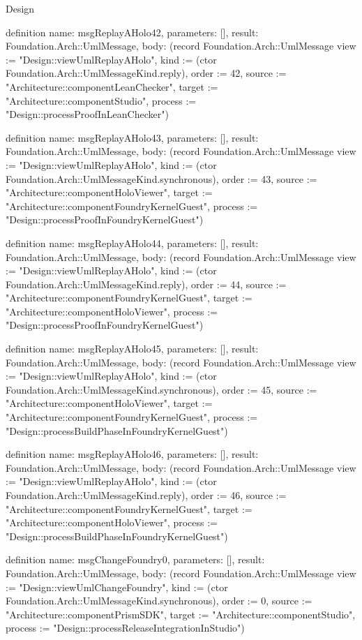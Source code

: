 \begin{lexlean}{Design}
\begin{semanticmodule}
definition{
  name: msgReplayAHolo42,
  parameters: [],
  result: Foundation.Arch::UmlMessage,
  body: (record Foundation.Arch::UmlMessage {view := "Design::viewUmlReplayAHolo", kind := (ctor Foundation.Arch::UmlMessageKind.reply), order := 42, source := "Architecture::componentLeanChecker", target := "Architecture::componentStudio", process := "Design::processProofInLeanChecker"})
}

definition{
  name: msgReplayAHolo43,
  parameters: [],
  result: Foundation.Arch::UmlMessage,
  body: (record Foundation.Arch::UmlMessage {view := "Design::viewUmlReplayAHolo", kind := (ctor Foundation.Arch::UmlMessageKind.synchronous), order := 43, source := "Architecture::componentHoloViewer", target := "Architecture::componentFoundryKernelGuest", process := "Design::processProofInFoundryKernelGuest"})
}

definition{
  name: msgReplayAHolo44,
  parameters: [],
  result: Foundation.Arch::UmlMessage,
  body: (record Foundation.Arch::UmlMessage {view := "Design::viewUmlReplayAHolo", kind := (ctor Foundation.Arch::UmlMessageKind.reply), order := 44, source := "Architecture::componentFoundryKernelGuest", target := "Architecture::componentHoloViewer", process := "Design::processProofInFoundryKernelGuest"})
}

definition{
  name: msgReplayAHolo45,
  parameters: [],
  result: Foundation.Arch::UmlMessage,
  body: (record Foundation.Arch::UmlMessage {view := "Design::viewUmlReplayAHolo", kind := (ctor Foundation.Arch::UmlMessageKind.synchronous), order := 45, source := "Architecture::componentHoloViewer", target := "Architecture::componentFoundryKernelGuest", process := "Design::processBuildPhaseInFoundryKernelGuest"})
}

definition{
  name: msgReplayAHolo46,
  parameters: [],
  result: Foundation.Arch::UmlMessage,
  body: (record Foundation.Arch::UmlMessage {view := "Design::viewUmlReplayAHolo", kind := (ctor Foundation.Arch::UmlMessageKind.reply), order := 46, source := "Architecture::componentFoundryKernelGuest", target := "Architecture::componentHoloViewer", process := "Design::processBuildPhaseInFoundryKernelGuest"})
}

definition{
  name: msgChangeFoundry0,
  parameters: [],
  result: Foundation.Arch::UmlMessage,
  body: (record Foundation.Arch::UmlMessage {view := "Design::viewUmlChangeFoundry", kind := (ctor Foundation.Arch::UmlMessageKind.synchronous), order := 0, source := "Architecture::componentPrismSDK", target := "Architecture::componentStudio", process := "Design::processReleaseIntegrationInStudio"})
}


\end{semanticmodule}
\end{lexlean}
